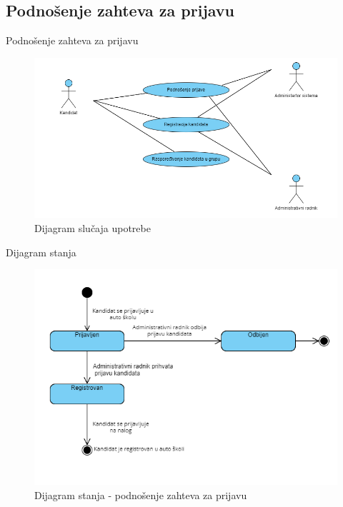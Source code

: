 \documentclass[compress, containsverbatim,mathserif, xcolor=dvipsnames, unicode]{beamer}
\begin{document}
\subsection{Podnošenje zahteva za prijavu}
\begin{frame}{Podnošenje zahteva za prijavu}
        \begin{figure}[h!]
        \begin{center}
          \includegraphics[scale = 0.5]{podnosenje_zahteva_za_prijavu.png}
        \end{center}
       \caption{Dijagram slučaja upotrebe}
    \end{figure}   
\end{frame}

\begin{frame}{Dijagram stanja}
        \begin{figure}[h!]
        \begin{center}
          \includegraphics[scale = 0.5]{dijagram_stanja_registracija.png}
        \end{center}
       \caption{Dijagram stanja - podnošenje zahteva za prijavu}
    \end{figure}   
\end{frame}
\end{document}

